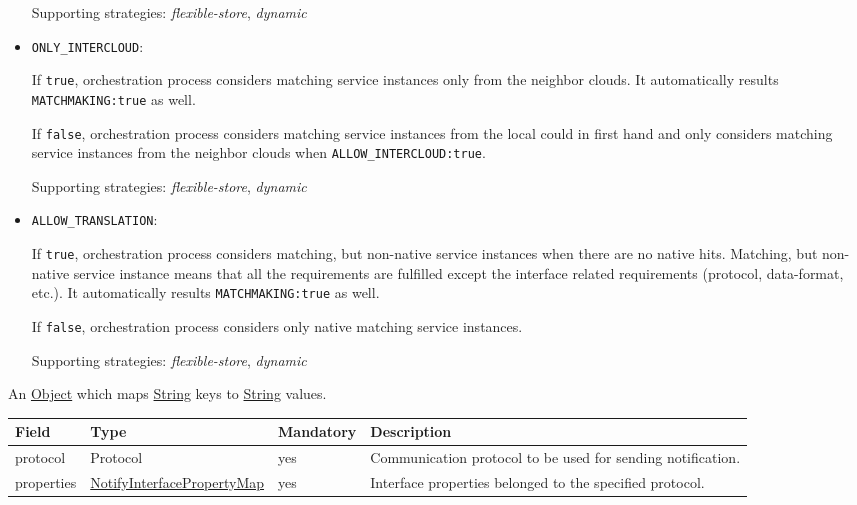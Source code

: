 \documentclass[a4paper]{arrowhead}
\newcommand{\pdef}[1]{{\textcolor{ArrowheadGrey}{#1\label{sec:model:primitives:#1}\label{sec:model:primitives:#1s}\label{sec:model:primitives:#1es}}}}
\newcommand{\pref}[1]{{\textcolor{ArrowheadGrey}{\hyperref[sec:model:primitives:#1]{#1}}}}
\begin{document}
\begin{itemize}
    Supporting strategies: \textit{flexible-store}, \textit{dynamic}

    \item \texttt{ONLY\_INTERCLOUD}:

    If \texttt{true}, orchestration process considers matching service instances only from the neighbor clouds. It automatically results \texttt{MATCHMAKING:true} as well.

    If \texttt{false}, orchestration process considers matching service instances from the local could in first hand and only considers matching service instances from the neighbor clouds when \texttt{ALLOW\_INTERCLOUD:true}.

    Supporting strategies: \textit{flexible-store}, \textit{dynamic}
    
    \item \texttt{ALLOW\_TRANSLATION}:

    If \texttt{true}, orchestration process considers matching, but non-native service instances when there are no native hits. Matching, but non-native service instance means that all the requirements are fulfilled except the interface related requirements (protocol, data-format, etc.). It automatically results \texttt{MATCHMAKING:true} as well.

     If \texttt{false}, orchestration process considers only native matching service instances.

     Supporting strategies: \textit{flexible-store}, \textit{dynamic}
    
\end{itemize}


An \pref{Object} which maps \pref{String} keys to \pref{String} values.


\begin{table}[ht!]
\begin{tabularx}{\textwidth}{| p{3.2cm} | p{4.3cm} | p{2cm} | X |} \hline
\rowcolor{gray!33} Field & Type & Mandatory & Description \\ \hline
protocol & \pdef{Protocol} & yes & Communication protocol to be used for sending notification. \\ \hline
properties & \hyperref[sec:model:NotifyInterfacePropertyMap]{NotifyInterfacePropertyMap} & yes & Interface properties belonged to the specified protocol. \\ \hline
\end{tabularx}
\end{table}
\end{document}
